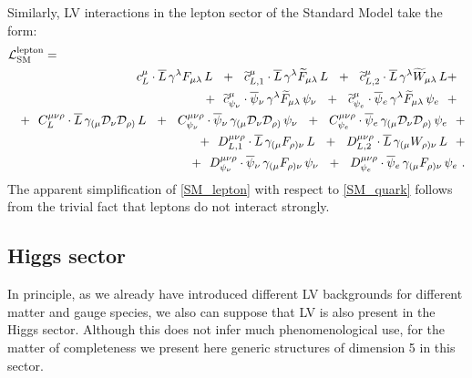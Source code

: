 \documentclass[12pt]{revtex4}
\newcommand{\wt}{\widetilde}
\newcommand{\ov}{\overline}
\newcommand{\md}{\mathcal{D}}
\begin{document}


	Similarly, LV interactions in the lepton sector of the Standard Model
	take the form:
\begin{eqnarray}
\nonumber
\lefteqn{
	\mathcal{L}_{\rm SM}^{\rm lepton} =
	}
	\\
\nonumber
	&&
	\phantom{+~~}
	c_L^\mu \cdot
	\ov{L}\, \gamma^{\lambda} F_{\mu\lambda}\, L
	~~+~~
	\wt{c}_{L,1}^\mu \cdot
	\ov{L}\, \gamma^{\lambda} \wt{F}_{\mu\lambda}\, L
	~~+~~
	\wt{c}_{L,2}^\mu \cdot
	\ov{L}\, \gamma^{\lambda} \wt{W}_{\mu\lambda}\, L
	+~~
	\\
\nonumber
	&&
	+~~
	\wt{c}_{\psi_\nu}^\mu \cdot
	\ov{\psi}{}_\nu\, \gamma^{\lambda} \wt{F}_{\mu\lambda}\, \psi_\nu
	~~+~~
	\wt{c}_{\psi_e}^\mu \cdot
	\ov{\psi}{}_e\, \gamma^{\lambda} \wt{F}_{\mu\lambda}\, \psi_e
	~~+~~
	\\
\nonumber
	&&
	+~~
	C_L^{\mu\nu\rho} \cdot
	\ov{L}\, \gamma_{(\mu} \md_\nu \md_{\rho)}\, L
	~~+~~
	C_{\psi_\nu}^{\mu\nu\rho} \cdot
	\ov{\psi}{}_\nu\, \gamma_{(\mu} \md_\nu \md_{\rho)}\, \psi_\nu
	~~+~~
	C_{\psi_e}^{\mu\nu\rho} \cdot
	\ov{\psi}{}_e\, \gamma_{(\mu} \md_\nu \md_{\rho)}\, \psi_e
	~~+
	\\
\label{SM_lepton}
	&&
	+~~
	D_{L,1}^{\mu\nu\rho} \cdot
	\ov{L}\, \gamma_{(\mu} F_{\rho)\nu}\, L
	~~+~~
	D_{L,2}^{\mu\nu\rho} \cdot
	\ov{L}\, \gamma_{(\mu} W_{\rho)\nu}\, L
	~~+
	\\
\nonumber
	&&
	+~~
	D_{\psi_\nu}^{\mu\nu\rho} \cdot
	\ov{\psi}{}_\nu\, \gamma_{(\mu} F_{\rho)\nu}\, \psi_\nu
	~~+~~
	D_{\psi_e}^{\mu\nu\rho} \cdot
	\ov{\psi}{}_e\, \gamma_{(\mu} F_{\rho)\nu}\, \psi_e
	~.
\end{eqnarray}
	The apparent simplification of \eqref{SM_lepton} with respect to 
	\eqref{SM_quark} follows from the trivial fact that leptons do not
	interact strongly.

\subsection{Higgs sector}	
	In principle, as we already have introduced different LV backgrounds
	for different matter and gauge species, we also can suppose that 
	LV is also present in the Higgs sector.
	Although this does not infer much phenomenological use,
	for the matter of completeness we present here generic structures
	of dimension 5 in this sector.
\end{document}
